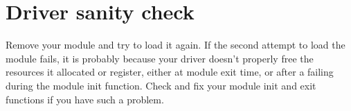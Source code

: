 \section{Driver sanity check}

Remove your module and try to load it again. If the second attempt to
load the module fails, it is probably because your driver doesn't
properly free the resources it allocated or register, either at module
exit time, or after a failing during the module init function. Check
and fix your module init and exit functions if you have such a
problem.
